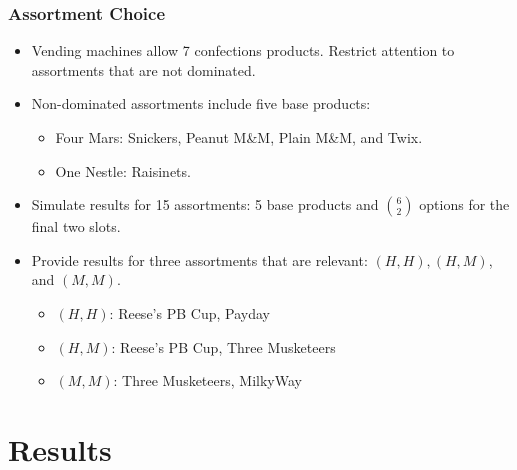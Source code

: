 \begin{frame}[label=main]
\frametitle{Assortment Choice}
\begin{itemize}
\item Vending machines allow 7 confections products. Restrict attention to assortments that are not dominated.
\item Non-dominated assortments include five base products:
\begin{itemize}
\item Four Mars: Snickers, Peanut M\&M, Plain M\&M, and Twix. 
\item One Nestle: Raisinets.
\end{itemize}
\item Simulate results for 15 assortments: 5 base products and $6 \choose 2$ options for the final two slots.
\item Provide results for three assortments that are relevant: $(H,H), (H,M)$, and $(M,M)$.
\begin{itemize}
\item $(H,H)$: Reese's PB Cup, Payday
\item $(H,M)$: Reese's PB Cup, Three Musketeers
\item $(M,M)$: Three Musketeers, MilkyWay
\end{itemize}
\end{itemize}
\hyperlink{supplemental1}{}
\hyperlink{supplemental2}{}
\end{frame}


\section{Results}

